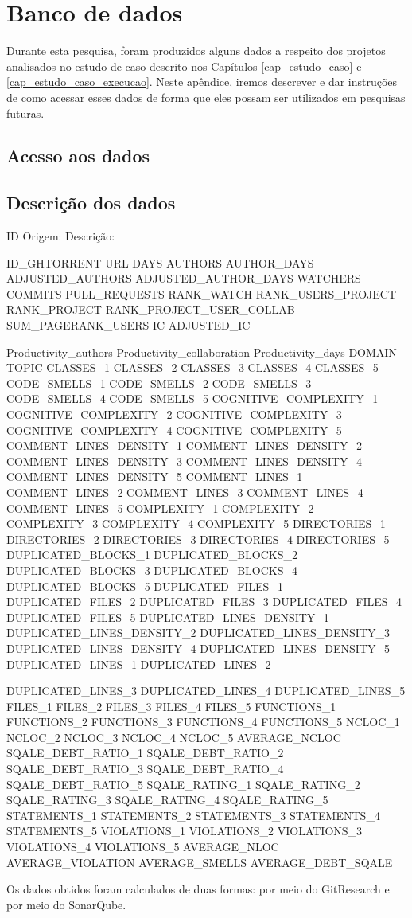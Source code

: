 \chapter{Banco de dados}
\label{apendice_banco_dados}

Durante esta pesquisa, foram produzidos alguns dados a respeito dos projetos analisados no estudo de caso descrito nos Capítulos \ref{cap_estudo_caso} e \ref{cap_estudo_caso_execucao}. Neste apêndice, iremos descrever e dar instruções de como acessar esses dados de forma que eles possam ser utilizados em pesquisas futuras.

\section{Acesso aos dados}

\section{Descrição dos dados}


ID
Origem:
Descrição:

ID\_GHTORRENT
URL
DAYS
AUTHORS
AUTHOR\_DAYS
ADJUSTED\_AUTHORS
ADJUSTED\_AUTHOR\_DAYS
WATCHERS
COMMITS
PULL\_REQUESTS
RANK\_WATCH
RANK\_USERS\_PROJECT
RANK\_PROJECT
RANK\_PROJECT\_USER\_COLLAB
SUM\_PAGERANK\_USERS
IC
ADJUSTED\_IC

Productivity\_authors
Productivity\_collaboration
Productivity\_days
DOMAIN
TOPIC
CLASSES\_1
CLASSES\_2
CLASSES\_3
CLASSES\_4
CLASSES\_5
CODE\_SMELLS\_1
CODE\_SMELLS\_2
CODE\_SMELLS\_3
CODE\_SMELLS\_4
CODE\_SMELLS\_5
COGNITIVE\_COMPLEXITY\_1
COGNITIVE\_COMPLEXITY\_2
COGNITIVE\_COMPLEXITY\_3
COGNITIVE\_COMPLEXITY\_4
COGNITIVE\_COMPLEXITY\_5
COMMENT\_LINES\_DENSITY\_1
COMMENT\_LINES\_DENSITY\_2
COMMENT\_LINES\_DENSITY\_3
COMMENT\_LINES\_DENSITY\_4
COMMENT\_LINES\_DENSITY\_5
COMMENT\_LINES\_1
COMMENT\_LINES\_2
COMMENT\_LINES\_3
COMMENT\_LINES\_4
COMMENT\_LINES\_5
COMPLEXITY\_1
COMPLEXITY\_2
COMPLEXITY\_3
COMPLEXITY\_4
COMPLEXITY\_5
DIRECTORIES\_1
DIRECTORIES\_2
DIRECTORIES\_3
DIRECTORIES\_4
DIRECTORIES\_5
DUPLICATED\_BLOCKS\_1
DUPLICATED\_BLOCKS\_2
DUPLICATED\_BLOCKS\_3
DUPLICATED\_BLOCKS\_4
DUPLICATED\_BLOCKS\_5
DUPLICATED\_FILES\_1
DUPLICATED\_FILES\_2
DUPLICATED\_FILES\_3
DUPLICATED\_FILES\_4
DUPLICATED\_FILES\_5
DUPLICATED\_LINES\_DENSITY\_1
DUPLICATED\_LINES\_DENSITY\_2
DUPLICATED\_LINES\_DENSITY\_3
DUPLICATED\_LINES\_DENSITY\_4
DUPLICATED\_LINES\_DENSITY\_5
DUPLICATED\_LINES\_1
DUPLICATED\_LINES\_2

DUPLICATED\_LINES\_3
DUPLICATED\_LINES\_4
DUPLICATED\_LINES\_5
FILES\_1
FILES\_2
FILES\_3
FILES\_4
FILES\_5
FUNCTIONS\_1
FUNCTIONS\_2
FUNCTIONS\_3
FUNCTIONS\_4
FUNCTIONS\_5
NCLOC\_1
NCLOC\_2
NCLOC\_3
NCLOC\_4
NCLOC\_5
AVERAGE\_NCLOC
SQALE\_DEBT\_RATIO\_1
SQALE\_DEBT\_RATIO\_2
SQALE\_DEBT\_RATIO\_3
SQALE\_DEBT\_RATIO\_4
SQALE\_DEBT\_RATIO\_5
SQALE\_RATING\_1
SQALE\_RATING\_2
SQALE\_RATING\_3
SQALE\_RATING\_4
SQALE\_RATING\_5
STATEMENTS\_1
STATEMENTS\_2
STATEMENTS\_3
STATEMENTS\_4
STATEMENTS\_5
VIOLATIONS\_1
VIOLATIONS\_2
VIOLATIONS\_3
VIOLATIONS\_4
VIOLATIONS\_5
AVERAGE\_NLOC
AVERAGE\_VIOLATION
AVERAGE\_SMELLS
AVERAGE\_DEBT\_SQALE






Os dados obtidos foram calculados de duas formas: por meio do GitResearch e por meio do SonarQube.


